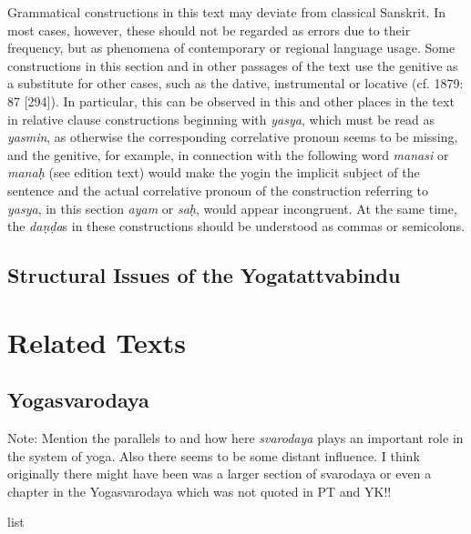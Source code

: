 {Grammatical constructions in this text may deviate from classical Sanskrit. In most cases, however, these should not be regarded as errors due to their frequency, but as phenomena of contemporary or regional language usage. Some constructions in this section and in other passages of the text use the genitive as a substitute for other cases, such as the dative, instrumental or locative (cf. \citeauthor{whitney1879} 1879: 87 [294]). In particular, this can be observed in this and other places in the text in relative clause constructions beginning with \textit{yasya}, which must be read as \textit{yasmin}, as otherwise the corresponding correlative pronoun seems to be missing, and the genitive, for example, in connection with the following word \textit{manasi} or \textit{manaḥ} (see edition text) would make the yogin the implicit subject of the sentence and the actual correlative pronoun of the construction referring to \textit{yasya}, in this section \textit{ayam} or \textit{saḥ}, would appear incongruent. At the same time, the \textit{daṇḍa}s in these constructions should be understood as commas or semicolons.     

\section{Structural Issues of the Yogatattvabindu}
\label{structure}
\chapter{Related Texts}

\section{Yogasvarodaya}

Note: Mention the parallels to  and how here \textit{svarodaya} plays an important role in the system of yoga. Also there seems to be some distant influence. I think originally there might have been was a larger section of svarodaya or even a chapter in the Yogasvarodaya which was not quoted in PT and YK!!


list 

}
